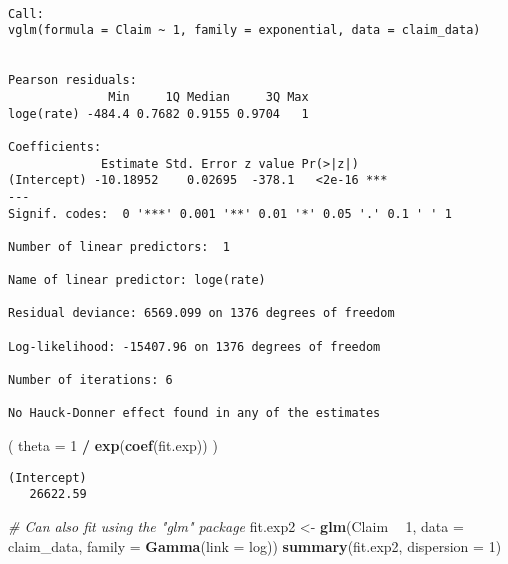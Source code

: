 \documentclass[]{book}
\newenvironment{Shaded}{\begin{snugshade}}{\end{snugshade}}
\newcommand{\KeywordTok}[1]{\textcolor[rgb]{0.13,0.29,0.53}{\textbf{#1}}}
\newcommand{\DataTypeTok}[1]{\textcolor[rgb]{0.13,0.29,0.53}{#1}}
\newcommand{\DecValTok}[1]{\textcolor[rgb]{0.00,0.00,0.81}{#1}}
\newcommand{\StringTok}[1]{\textcolor[rgb]{0.31,0.60,0.02}{#1}}
\newcommand{\CommentTok}[1]{\textcolor[rgb]{0.56,0.35,0.01}{\textit{#1}}}
\newcommand{\OperatorTok}[1]{\textcolor[rgb]{0.81,0.36,0.00}{\textbf{#1}}}
\newcommand{\NormalTok}[1]{#1}
\theoremstyle{definition}
\theoremstyle{definition}
\theoremstyle{definition}
\theoremstyle{remark}
\begin{document}
\begin{verbatim}

Call:
vglm(formula = Claim ~ 1, family = exponential, data = claim_data)


Pearson residuals:
              Min     1Q Median     3Q Max
loge(rate) -484.4 0.7682 0.9155 0.9704   1

Coefficients: 
             Estimate Std. Error z value Pr(>|z|)    
(Intercept) -10.18952    0.02695  -378.1   <2e-16 ***
---
Signif. codes:  0 '***' 0.001 '**' 0.01 '*' 0.05 '.' 0.1 ' ' 1

Number of linear predictors:  1 

Name of linear predictor: loge(rate) 

Residual deviance: 6569.099 on 1376 degrees of freedom

Log-likelihood: -15407.96 on 1376 degrees of freedom

Number of iterations: 6 

No Hauck-Donner effect found in any of the estimates
\end{verbatim}

\begin{Shaded}
\begin{Highlighting}[]
\NormalTok{( }\DataTypeTok{theta =} \DecValTok{1} \OperatorTok{/}\StringTok{ }\KeywordTok{exp}\NormalTok{(}\KeywordTok{coef}\NormalTok{(fit.exp)) )}
\end{Highlighting}
\end{Shaded}

\begin{verbatim}
(Intercept) 
   26622.59 
\end{verbatim}

\begin{Shaded}
\begin{Highlighting}[]
\CommentTok{# Can also fit using the "glm" package}
\NormalTok{fit.exp2 <-}\StringTok{ }\KeywordTok{glm}\NormalTok{(Claim }\OperatorTok{~}\StringTok{ }\DecValTok{1}\NormalTok{, }\DataTypeTok{data =}\NormalTok{ claim_data, }\DataTypeTok{family =} \KeywordTok{Gamma}\NormalTok{(}\DataTypeTok{link =}\NormalTok{ log)) }
\KeywordTok{summary}\NormalTok{(fit.exp2, }\DataTypeTok{dispersion =} \DecValTok{1}\NormalTok{)}
\end{Highlighting}
\end{Shaded}
\end{document}
